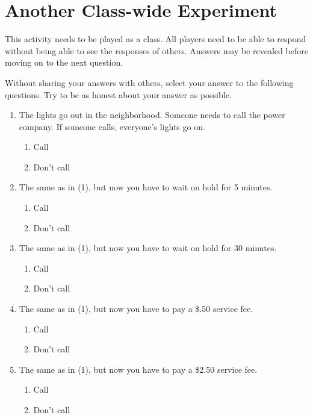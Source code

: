 
\section{Another Class-wide Experiment}

This activity needs to be played as a class. All players need to be able to respond without being able to see the responses of others. Answers may be revealed before moving on to the next question.

Without sharing your answers with others, select your answer to the following questions. Try to be as honest about your answer as possible.

\begin{enumerate}
\item The lights go out in the neighborhood. Someone needs to call the power company. If someone calls, everyone's lights go on.

\begin{enumerate}
\item Call
\item Don't call
\end{enumerate}

\item The same as in (1), but now you have to wait on hold for 5 minutes.

\begin{enumerate}
\item Call
\item Don't call
\end{enumerate}

\item The same as in (1), but now you have to wait on hold for 30 minutes.

\begin{enumerate}
\item Call
\item Don't call
\end{enumerate}

\item The same as in (1), but now you have to pay a \$.50 service fee.

\begin{enumerate}
\item Call
\item Don't call
\end{enumerate}

\item The same as in (1), but now you have to pay a \$2.50 service fee.

\begin{enumerate}
\item Call
\item Don't call
\end{enumerate}


\end{enumerate}
